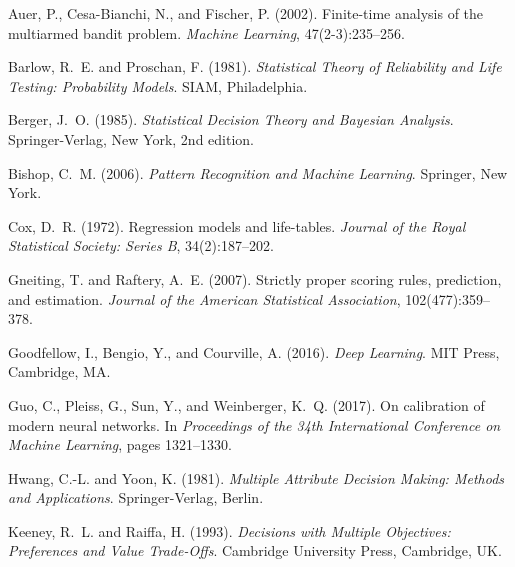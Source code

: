 \documentclass[12pt,a4paper]{article}
\begin{document}


\begin{thebibliography}{99}

Auer, P., Cesa-Bianchi, N., and Fischer, P. (2002).
\newblock Finite-time analysis of the multiarmed bandit problem.
\newblock \emph{Machine Learning}, 47(2-3):235--256.

Barlow, R.~E. and Proschan, F. (1981).
\newblock \emph{Statistical Theory of Reliability and Life Testing: Probability Models}.
\newblock SIAM, Philadelphia.

Berger, J.~O. (1985).
\newblock \emph{Statistical Decision Theory and Bayesian Analysis}.
\newblock Springer-Verlag, New York, 2nd edition.

Bishop, C.~M. (2006).
\newblock \emph{Pattern Recognition and Machine Learning}.
\newblock Springer, New York.

Cox, D.~R. (1972).
\newblock Regression models and life-tables.
\newblock \emph{Journal of the Royal Statistical Society: Series B}, 34(2):187--202.

Gneiting, T. and Raftery, A.~E. (2007).
\newblock Strictly proper scoring rules, prediction, and estimation.
\newblock \emph{Journal of the American Statistical Association}, 102(477):359--378.

Goodfellow, I., Bengio, Y., and Courville, A. (2016).
\newblock \emph{Deep Learning}.
\newblock MIT Press, Cambridge, MA.

Guo, C., Pleiss, G., Sun, Y., and Weinberger, K.~Q. (2017).
\newblock On calibration of modern neural networks.
\newblock In \emph{Proceedings of the 34th International Conference on Machine Learning}, pages 1321--1330.

Hwang, C.-L. and Yoon, K. (1981).
\newblock \emph{Multiple Attribute Decision Making: Methods and Applications}.
\newblock Springer-Verlag, Berlin.

Keeney, R.~L. and Raiffa, H. (1993).
\newblock \emph{Decisions with Multiple Objectives: Preferences and Value Trade-Offs}.
\newblock Cambridge University Press, Cambridge, UK.


\end{thebibliography}
\end{document}
